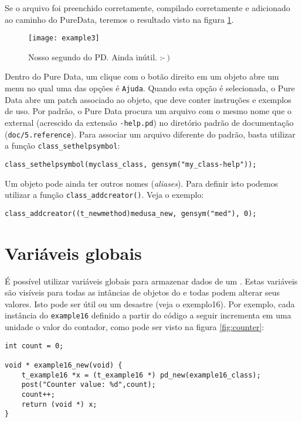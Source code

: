 Se o arquivo foi preenchido corretamente, compilado corretamente e adicionado
ao caminho do PureData, teremos o resultado visto na figura \ref{fig:exemplo3}.

\begin{figure}[h!]
	\centering
	\texttt{[image: example3]}
	\caption{Nosso segundo \external do PD. Ainda inútil. :-$\left.\right)$}
        \label{fig:exemplo3}
\end{figure}


Dentro do Pure Data, um clique com o botão direito em um objeto abre um menu
no qual uma das opções é \texttt{Ajuda}. Quando esta opção é selecionada, o
Pure Data abre um patch associado ao objeto, que deve conter instruções e
exemplos de uso. Por padrão, o Pure Data procura um arquivo com o mesmo nome
que o external (acrescido da extensão \texttt{-help.pd}) no diretório padrão de
documentação (\texttt{doc/5.reference}). Para associar um arquivo diferente do
padrão, basta utilizar a função \texttt{class\_sethelpsymbol}:

\vspace{1em}
\begin{lstlisting}
class_sethelpsymbol(myclass_class, gensym("my_class-help"));
\end{lstlisting}

Um objeto pode ainda ter outros nomes (\emph{aliases}). Para definir isto
podemos utilizar a função \texttt{class\_addcreator()}. Veja o exemplo:

\vspace{1em}
\begin{lstlisting}
class_addcreator((t_newmethod)medusa_new, gensym("med"), 0);
\end{lstlisting}

\section{Variáveis globais}

É possível utilizar variáveis globais para armazenar dados de um \external.
Estas variáveis são visíveis para todas as intâncias de objetos do \external e
todas podem alterar seus valores. Isto pode ser útil ou um desastre (veja o
exemplo16). Por exemplo, cada instância do \external \texttt{example16}
definido a partir do código a seguir incrementa em uma unidade o valor do
contador, como pode ser visto na figura \ref{fig:counter}:

\vspace{1em}
\begin{lstlisting}
int count = 0;

void * example16_new(void) {
    t_example16 *x = (t_example16 *) pd_new(example16_class);
    post("Counter value: %d",count);
    count++;
    return (void *) x;
}
\end{lstlisting}


